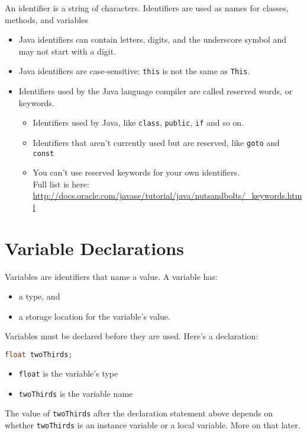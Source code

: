 \documentclass{article}
\begin{document}
An identifier is a string of characters.  Identifiers are used as names for classes, methods, and variables
\begin{itemize}
\item Java identifiers can contain letters, digits, and the underscore symbol and may not start with a digit.
\item Java identifiers are case-sensitive:  {\tt this} is not the same as {\tt This}.
\item Identifiers used by the Java language compiler are called reserved words, or keywords.
\begin{itemize}
\item Identifiers used by Java, like {\tt class}, {\tt public}, {\tt if} and so on.
\item Identifiers that aren't currently used but are reserved, like {\tt goto} and {\tt const}
\item You can't use reserved keywords for your own identifiers.\\
Full list is here: \url{http://docs.oracle.com/javase/tutorial/java/nutsandbolts/_keywords.html}
\end{itemize}

\end{itemize}





\section{Variable Declarations}


Variables are identifiers that name a value. A variable has:
\begin{itemize}
\item a type, and
\item a storage location for the variable's value.
\end{itemize}

Variables must be declared before they are used.  Here's a declaration:
\begin{lstlisting}[language=Java]
float twoThirds;
\end{lstlisting}
\begin{itemize}
\item {\tt float} is the variable's type
\item {\tt twoThirds} is the variable name
\end{itemize}
The value of {\tt twoThirds} after the declaration statement above depends on whether {\tt twoThirds} is an instance variable or a local variable.  More on that later.
\end{document}
